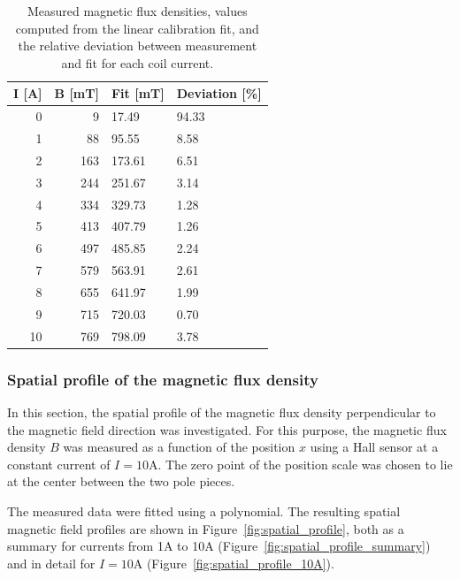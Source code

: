 \documentclass{article}
\begin{document}
\begin{table}[!ht]
    \centering
    \begin{tabular}{rrll}
    \hline
        \textbf{I [A]} & \textbf{B [mT]} & \textbf{Fit [mT]} & \textbf{Deviation [\%]} \\ \hline \hline
        0 & 9 & 17.49 & 94.33 \\ \hline
        1 & 88 & 95.55 & 8.58 \\ \hline
        2 & 163 & 173.61 & 6.51 \\ \hline
        3 & 244 & 251.67 & 3.14 \\ \hline
        4 & 334 & 329.73 & 1.28 \\ \hline
        5 & 413 & 407.79 & 1.26 \\ \hline
        6 & 497 & 485.85 & 2.24 \\ \hline
        7 & 579 & 563.91 & 2.61 \\ \hline
        8 & 655 & 641.97 & 1.99 \\ \hline
        9 & 715 & 720.03 & 0.70 \\ \hline
        10 & 769 & 798.09 & 3.78 \\ \hline
    \end{tabular}
    \caption{Measured magnetic flux densities, values computed from the linear calibration fit, and the relative deviation between measurement and fit for each coil current.}
\end{table}

\subsubsection{Spatial profile of the magnetic flux density}

In this section, the spatial profile of the magnetic flux density perpendicular to the magnetic field direction was investigated. For this purpose, the magnetic flux density $B$ was measured as a function of the position $x$ using a Hall sensor at a constant current of $I = 10$A. The zero point of the position scale was chosen to lie at the center between the two pole pieces.

The measured data were fitted using a polynomial. The resulting spatial magnetic field profiles are shown in Figure~\ref{fig:spatial_profile}, both as a summary for currents from 1A to 10A (Figure~\ref{fig:spatial_profile_summary}) and in detail for $I = 10$A (Figure~\ref{fig:spatial_profile_10A}).
\end{document}
